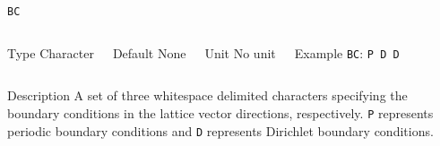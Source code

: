 \begin{frame}[allowframebreaks]{\texttt{BC}} \label{BC}
\vspace*{-12pt}
\begin{columns}
\begin{block}{Type}
Character
\end{block}

\begin{block}{Default}
None
\end{block}

\begin{block}{Unit}
No unit
\end{block}

\begin{block}{Example}
\texttt{BC}: \texttt{P D D}
\end{block}
\end{columns}

\begin{block}{Description}
A set of three whitespace delimited characters specifying the boundary conditions in the lattice vector directions, respectively. \texttt{P} represents periodic boundary conditions and \texttt{D} represents Dirichlet boundary conditions.
\end{block}

\end{frame}



